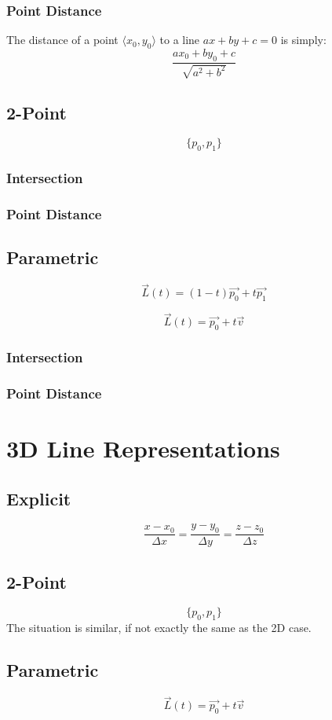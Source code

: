 \documentclass[12pt]{report}
\begin{document}
		\subsubsection{Point Distance}
		The distance of a point $\langle x_0, y_0\rangle$ to a line $ax + by + c = 0$ is simply:
		$$
		\frac{ax_0 + by_0 + c}{\sqrt{a^2 + b^2}}
		$$
	\subsection{2-Point}
	$$
	\{p_0, p_1\}
	$$
		\subsubsection{Intersection}
		\subsubsection{Point Distance}
	\subsection{Parametric}
	$$
	\vec{L}(t) = (1- t) \vec{p_0} + t\vec{p_1}
	$$
	
	$$
	\vec{L}(t) = \vec{p_0} + t\vec{v}
	$$
		\subsubsection{Intersection}
		
		\subsubsection{Point Distance}
\section{3D Line Representations}
	\subsection{Explicit}
	$$
	\frac{x - x_0}{\Delta x} = \frac{y - y_0}{\Delta y} = \frac{z - z_0}{\Delta z}
	$$
	\subsection{2-Point}
	$$
		\{p_0, p_1\}
	$$
	The situation is similar, if not exactly the same as the 2D case.
	\subsection{Parametric}
	$$
	\vec{L}(t) = \vec{p_0} + t\vec{v}
	$$
	
\end{document}
